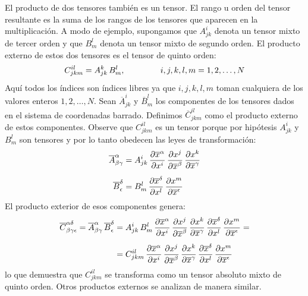 \documentclass[hidelinks,12pt]{article}
\begin{document}
El producto de dos tensores también es un tensor. El rango u orden del tensor resultante es la suma de los rangos de los tensores que aparecen en la multiplicación. A modo de ejemplo, supongamos que $A_{jk}^{i}$ denota un tensor mixto de tercer orden y que $B_{m}^{l}$ denota un tensor mixto de segundo orden. El producto externo de estos dos tensores es el tensor de quinto orden:
\begin{align*}
C_{jkm}^{il} = A_{jk}^{k} \, B_{m}^{l}, \hspace{1.5cm} i, j, k, l, m = 1, 2, \ldots, N
\end{align*}
Aquí todos los índices son índices libres ya que $i, j, k, l, m$ toman cualquiera de los valores enteros $1, 2, \ldots, N$. Sean $\overline{A}_{jk}^{i}$ y $\overline{B}_{m}^{l}$ los componentes de los tensores dados en el sistema de coordenadas barrado. Definimos $\overline{C}_{jkm}^{il}$ como el producto externo de estos componentes. Observe que $C_{jkm}^{il}$ es un tensor porque por hipótesis $A_{jk}^{i}$ y $B_{m}^{l}$ son tensores y por lo tanto obedecen las leyes de transformación:
\begin{align}
\begin{aligned}
\overline{A}_{\beta \gamma}^{\alpha} &= A_{jk}^{i} \, \pdv{\overline{x}^{\alpha}}{x^{i}} \, \pdv{x^{j}}{\overline{x}^{\beta}} \, \pdv{x^{k}}{\overline{x}^{\gamma}} \\[0.5em]
\overline{B}_{\epsilon}^{\delta} &= B_{m}^{l} \, \pdv{ \overline{x}^{\delta}}{x^{l}} \, \pdv{x^{m}}{\overline{x}^{\epsilon}}
\end{aligned}
\label{eq:ecuacion_01_02_55}
\end{align}
El producto exterior de esos componentes genera:
\begin{align}
\begin{aligned}
\overline{C}_{\beta \gamma \epsilon}^{\alpha \delta} = \overline{A}_{\beta \gamma}^{\alpha} \, \overline{B}_{\epsilon}^{\delta} &= A_{jk}^{i} \, B_{m}^{l} \, \pdv{\overline{x}^{\alpha}}{x^{i}} \, \pdv{x^{j}}{\overline{x}^{\beta}} \, \pdv{x^{k}}{\overline{x}^{\gamma}} \, \pdv{\overline{x}^{\delta}}{x^{l}} \, \pdv{x^{m}}{\overline{x}^{\epsilon}} = \\[0.5em]
&= C_{jkm}^{il} \, \pdv{\overline{x}^{\alpha}}{x^{i}} \, \pdv{x^{j}}{\overline{x}^{\beta}} \, \pdv{x^{k}}{\overline{x}^{\gamma}} \, \pdv{\overline{x}^{\delta}}{x^{l}} \, \pdv{x^{m}}{\overline{x}^{\epsilon}}
\end{aligned}
\label{eq:ecuacion_01_02_56}
\end{align}
lo que demuestra que $C_{jkm}^{il}$ se transforma como un tensor absoluto mixto de quinto orden. Otros productos externos se analizan de manera similar.
\end{document}

